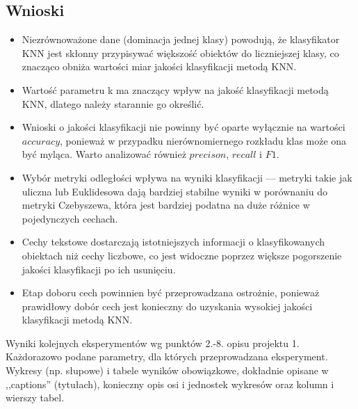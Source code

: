 \documentclass{article}
\begin{document}
\subsection{Wnioski}
\begin{itemize}
    \item Niezrównoważone dane (dominacja jednej klasy) powodują, że klasyfikator KNN jest skłonny przypisywać większość obiektów do liczniejszej klasy, co znacząco obniża wartości miar jakości klasyfikacji metodą KNN.
    \item Wartość parametru k ma znaczący wpływ na jakość klasyfikacji metodą KNN, dlatego należy starannie go określić.
    \item Wnioski o jakości klasyfikacji nie powinny być oparte wyłącznie na wartości \(accuracy\), ponieważ w przypadku nierównomiernego rozkładu klas może ona być myląca. Warto analizować również \(precison\), \(recall\) i \(F1\).
    \item Wybór metryki odległości wpływa na wyniki klasyfikacji — metryki takie jak uliczna lub Euklidesowa dają bardziej stabilne wyniki w porównaniu do metryki Czebyszewa, która jest bardziej podatna na duże różnice w pojedynczych cechach.
    \item Cechy tekstowe dostarczają istotniejszych informacji o klasyfikowanych obiektach niż cechy liczbowe, co jest widoczne poprzez większe pogorszenie jakości klasyfikacji po ich usunięciu.
    \item Etap doboru cech powinnien być przeprowadzana ostrożnie, ponieważ prawidłowy dobór cech jest konieczny do uzyskania wysokiej jakości klasyfikacji metodą KNN.
\end{itemize}
Wyniki kolejnych eksperymentów wg punktów 2.-8. opisu projektu 1.  Każdorazowo
podane parametry, dla których przeprowadzana eksperyment. 
Wykresy (np. słupowe) i tabele wyników
obowiązkowe, dokładnie opisane w ,,captions'' (tytułach), konieczny opis osi i
jednostek wykresów oraz kolumn i wierszy tabel.\\ 
\end{document}
